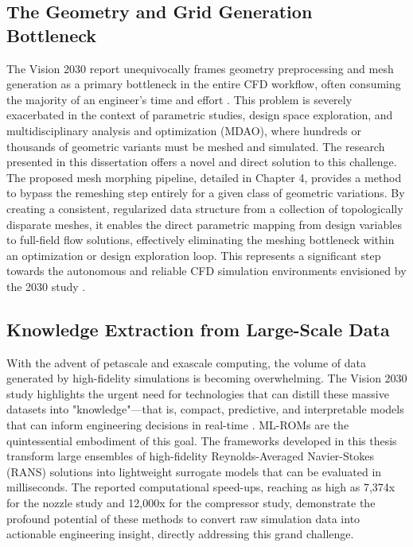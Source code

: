 \documentclass[dsc, EN]{ufabcFHZh}
\begin{document}
{\subsection{The Geometry and Grid Generation Bottleneck}

The Vision 2030 report unequivocally frames geometry preprocessing and mesh generation as a primary bottleneck in the entire CFD workflow, often consuming the majority of an engineer's time and effort \citep{Slotnick2014, Park2016}. This problem is severely exacerbated in the context of parametric studies, design space exploration, and multidisciplinary analysis and optimization (MDAO), where hundreds or thousands of geometric variants must be meshed and simulated. The research presented in this dissertation offers a novel and direct solution to this challenge. The proposed mesh morphing pipeline, detailed in Chapter 4, provides a method to bypass the remeshing step entirely for a given class of geometric variations. By creating a consistent, regularized data structure from a collection of topologically disparate meshes, it enables the direct parametric mapping from design variables to full-field flow solutions, effectively eliminating the meshing bottleneck within an optimization or design exploration loop. This represents a significant step towards the autonomous and reliable CFD simulation environments envisioned by the 2030 study \citep{Park2016}.


\subsection{Knowledge Extraction from Large-Scale Data}

With the advent of petascale and exascale computing, the volume of data generated by high-fidelity simulations is becoming overwhelming. The Vision 2030 study highlights the urgent need for technologies that can distill these massive datasets into "knowledge"—that is, compact, predictive, and interpretable models that can inform engineering decisions in real-time \citep{Slotnick2014}. ML-ROMs are the quintessential embodiment of this goal. The frameworks developed in this thesis transform large ensembles of high-fidelity Reynolds-Averaged Navier-Stokes (RANS) solutions into lightweight surrogate models that can be evaluated in milliseconds. The reported computational speed-ups, reaching as high as 7,374x for the nozzle study and 12,000x for the compressor study, demonstrate the profound potential of these methods to convert raw simulation data into actionable engineering insight, directly addressing this grand challenge. 

}
\end{document}
